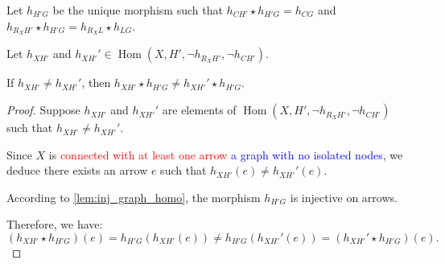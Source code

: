 \begin{lemma}
    \label{lem:1_dist}
    
            

    Let $h_{H'G}$ be the unique morphism such that $h_{CH'} \star h_{H'G} = h_{CG}$ and $h_{R_XH'} \star h_{H'G} = h_{R_XL} \star h_{LG}$.

    Let $h_{XH'}$ and $h_{XH'}' \in \operatorname{Hom}(X, H', \lnot h_{R_XH'}, \lnot h_{CH'})$. 
    
    If $h_{XH'} \neq h_{XH'}'$, then $h_{XH'} \star h_{H'G} \neq h_{XH'}' \star h_{H'G}$.
    
\end{lemma}

\begin{proof}
    Suppose $h_{XH'}$ and $h_{XH'}'$ are elements of $\operatorname{Hom}(X, H', \lnot h_{R_XH'}, \lnot h_{CH'})$ such that $h_{XH'} \neq h_{XH'}'$.

    Since $X$ is \textcolor{red}{connected with at least one arrow} \textcolor{blue}{a graph with no isolated nodes}, we deduce there exists an arrow $e$ such that $h_{XH'}(e) \neq h_{XH'}'(e)$.

    According to \autoref{lem:inj_graph_homo}, the morphism $h_{H'G}$ is injective on arrows.
    
    Therefore, we have:
    \[
    (h_{XH'} \star h_{H'G})(e) = h_{H'G}(h_{XH'}(e)) \neq h_{H'G}(h_{XH'}'(e)) = (h_{XH'}' \star h_{H'G})(e).
    \]
\end{proof}


